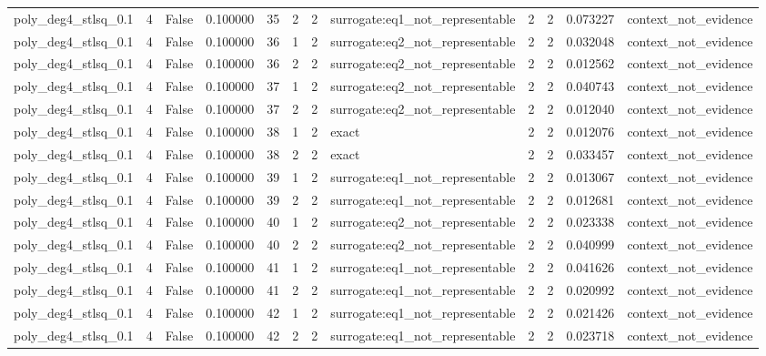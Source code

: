 \begin{tabular}{lrrrrrrlrrrl}
poly\_deg4\_stlsq\_0.1 & 4 & False & 0.100000 & 35 & 2 & 2 & surrogate:eq1\_not\_representable & 2 & 2 & 0.073227 & context\_not\_evidence \\
poly\_deg4\_stlsq\_0.1 & 4 & False & 0.100000 & 36 & 1 & 2 & surrogate:eq2\_not\_representable & 2 & 2 & 0.032048 & context\_not\_evidence \\
poly\_deg4\_stlsq\_0.1 & 4 & False & 0.100000 & 36 & 2 & 2 & surrogate:eq2\_not\_representable & 2 & 2 & 0.012562 & context\_not\_evidence \\
poly\_deg4\_stlsq\_0.1 & 4 & False & 0.100000 & 37 & 1 & 2 & surrogate:eq2\_not\_representable & 2 & 2 & 0.040743 & context\_not\_evidence \\
poly\_deg4\_stlsq\_0.1 & 4 & False & 0.100000 & 37 & 2 & 2 & surrogate:eq2\_not\_representable & 2 & 2 & 0.012040 & context\_not\_evidence \\
poly\_deg4\_stlsq\_0.1 & 4 & False & 0.100000 & 38 & 1 & 2 & exact & 2 & 2 & 0.012076 & context\_not\_evidence \\
poly\_deg4\_stlsq\_0.1 & 4 & False & 0.100000 & 38 & 2 & 2 & exact & 2 & 2 & 0.033457 & context\_not\_evidence \\
poly\_deg4\_stlsq\_0.1 & 4 & False & 0.100000 & 39 & 1 & 2 & surrogate:eq1\_not\_representable & 2 & 2 & 0.013067 & context\_not\_evidence \\
poly\_deg4\_stlsq\_0.1 & 4 & False & 0.100000 & 39 & 2 & 2 & surrogate:eq1\_not\_representable & 2 & 2 & 0.012681 & context\_not\_evidence \\
poly\_deg4\_stlsq\_0.1 & 4 & False & 0.100000 & 40 & 1 & 2 & surrogate:eq2\_not\_representable & 2 & 2 & 0.023338 & context\_not\_evidence \\
poly\_deg4\_stlsq\_0.1 & 4 & False & 0.100000 & 40 & 2 & 2 & surrogate:eq2\_not\_representable & 2 & 2 & 0.040999 & context\_not\_evidence \\
poly\_deg4\_stlsq\_0.1 & 4 & False & 0.100000 & 41 & 1 & 2 & surrogate:eq1\_not\_representable & 2 & 2 & 0.041626 & context\_not\_evidence \\
poly\_deg4\_stlsq\_0.1 & 4 & False & 0.100000 & 41 & 2 & 2 & surrogate:eq1\_not\_representable & 2 & 2 & 0.020992 & context\_not\_evidence \\
poly\_deg4\_stlsq\_0.1 & 4 & False & 0.100000 & 42 & 1 & 2 & surrogate:eq1\_not\_representable & 2 & 2 & 0.021426 & context\_not\_evidence \\
poly\_deg4\_stlsq\_0.1 & 4 & False & 0.100000 & 42 & 2 & 2 & surrogate:eq1\_not\_representable & 2 & 2 & 0.023718 & context\_not\_evidence \\

\end{tabular}
